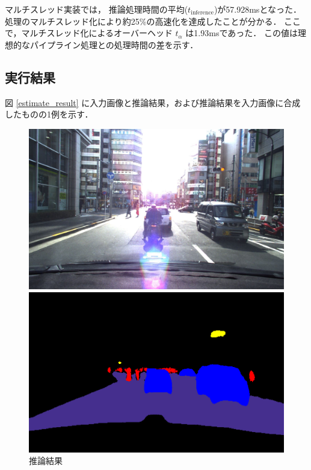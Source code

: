 マルチスレッド実装では，
推論処理時間の平均($t_{\mathrm{inference}}$)が57.928msとなった．
処理のマルチスレッド化により約25\%の高速化を達成したことが分かる．
ここで，マルチスレッド化によるオーバーヘッド $t_\alpha$ は1.93msであった．
この値は理想的なパイプライン処理との処理時間の差を示す．

\subsection{実行結果}

図 \ref{estimate_result} に入力画像と推論結果，および推論結果を入力画像に合成したものの1例を示す．

\begin{figure}[h]
  \begin{center}
    \caption{推論結果}
    \begin{minipage}{0.32\hsize}
      \begin{center}
        \includegraphics[width=\linewidth]{./figures/orig.jpg}
      \end{center}
    \end{minipage}
    \begin{minipage}{0.32\hsize}
      \begin{center}
        \includegraphics[width=\linewidth]{./figures/label.png}

\end{center}
\end{minipage}
\end{center}
\end{figure}
